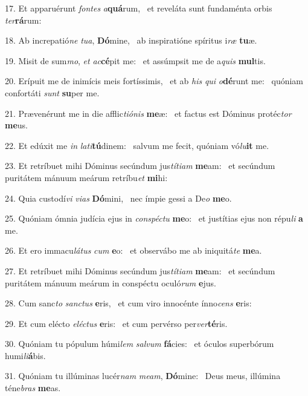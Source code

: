 17. Et apparuérunt \textit{fon}\textit{tes} \textit{a}\textbf{quá}rum, \ast\  et reveláta sunt fundaménta orbis \textit{ter}\textbf{rá}rum:\

18. Ab increpatió\textit{ne} \textit{tu}\textit{a}, \textbf{Dó}mine, \ast\  ab inspiratióne spíritus i\textit{ræ} \textbf{tu}æ.\

19. Misit de sum\textit{mo}, \textit{et} \textit{ac}\textbf{cé}pit me: \ast\  et assúmpsit me de a\textit{quis} \textbf{mul}tis.\

20. Erípuit me de inimícis meis fortíssimis, \dag\  et ab \textit{his} \textit{qui} \textit{o}\textbf{dé}runt me: \ast\  quóniam confortáti \textit{sunt} \textbf{su}per me.\

21. Prævenérunt me in die afflic\textit{ti}\textit{ó}\textit{nis} \textbf{me}æ: \ast\  et factus est Dóminus protéc\textit{tor} \textbf{me}us.\

22. Et edúxit me \textit{in} \textit{la}\textit{ti}\textbf{tú}dinem: \ast\  salvum me fecit, quóniam vó\textit{lu}\textbf{it} me.\

23. Et retríbuet mihi Dóminus secúndum jus\textit{tí}\textit{ti}\textit{am} \textbf{me}am: \ast\  et secúndum puritátem mánuum meárum retríbu\textit{et} \textbf{mi}hi:\

24. Quia custodí\textit{vi} \textit{vi}\textit{as} \textbf{Dó}mini, \ast\  nec ímpie gessi a De\textit{o} \textbf{me}o.\

25. Quóniam ómnia judícia ejus in \textit{con}\textit{spéc}\textit{tu} \textbf{me}o: \ast\  et justítias ejus non répu\textit{li} \textbf{a} me.\

26. Et ero immacu\textit{lá}\textit{tus} \textit{cum} \textbf{e}o: \ast\  et observábo me ab iniquitá\textit{te} \textbf{me}a.\

27. Et retríbuet mihi Dóminus secúndum jus\textit{tí}\textit{ti}\textit{am} \textbf{me}am: \ast\  et secúndum puritátem mánuum meárum in conspéctu oculó\textit{rum} \textbf{e}jus.\

28. Cum sanc\textit{to} \textit{sanc}\textit{tus} \textbf{e}ris, \ast\  et cum viro innocénte ínno\textit{cens} \textbf{e}ris:\

29. Et cum elécto \textit{e}\textit{léc}\textit{tus} \textbf{e}ris: \ast\  et cum pervérso per\textit{ver}\textbf{té}ris.\

30. Quóniam tu pópulum húmi\textit{lem} \textit{sal}\textit{vum} \textbf{fá}cies: \ast\  et óculos superbórum humi\textit{li}\textbf{á}bis.\

31. Quóniam tu illúminas lucér\textit{nam} \textit{me}\textit{am}, \textbf{Dó}mine: \ast\  Deus meus, illúmina téne\textit{bras} \textbf{me}as.\

